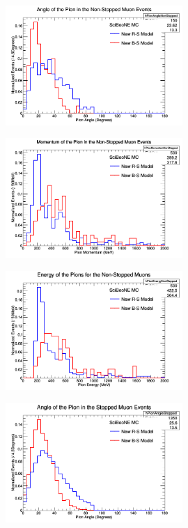 \documentclass[11pt]{article}
\begin{document}
\begin{figure}[H]
\centering
\includegraphics[width=0.6\textwidth]{ANMPionPlottingImages/1-ANMPionPlotting.png}
\caption{}
\end{figure}

\begin{figure}[H]
\centering
\includegraphics[width=0.6\textwidth]{ANMPionPlottingImages/2-ANMPionPlotting.png}
\caption{}
\end{figure}

\begin{figure}[H]
\centering
\includegraphics[width=0.6\textwidth]{ANMPionPlottingImages/3-ANMPionPlotting.png}
\caption{}
\end{figure}

\begin{figure}[H]
\centering
\includegraphics[width=0.6\textwidth]{ANMPionPlottingImages/4-ANMPionPlotting.png}
\caption{}
\end{figure}
\end{document}
